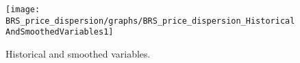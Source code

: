  
\begin{figure}[H]
\centering 
\texttt{[image: BRS\_price\_dispersion/graphs/BRS\_price\_dispersion\_HistoricalAndSmoothedVariables1]}
\caption{Historical and smoothed variables.}\label{Fig:HistoricalAndSmoothedVariables:1}
\end{figure}


